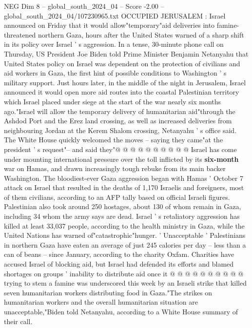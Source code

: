 \begin{textsample}{NEG Dim 8 – global\_south\_2024\_04 – Score -2.00 – global\_south\_2024\_04/107230965.txt}  \label{ex:f8_neg_028}
OCCUPIED JERUSALEM : Israel announced on Friday that it would allow"temporary"aid deliveries into famine-threatened northern Gaza, hours after the United States warned of a sharp shift in its policy over Israel ' s aggression.
In a tense, 30-minute phone call on Thursday, US President Joe Biden told Prime Minister Benjamin Netanyahu that United States policy on Israel was dependent on the protection of civilians and aid workers in Gaza, the first hint of possible conditions to Washington ' s military support.
Just hours later, in the middle of the night in Jerusalem, Israel announced it would open more aid routes into the coastal Palestinian territory which Israel placed under siege at the start of the war nearly six months ago."Israel will allow the temporary delivery of humanitarian aid"through the Ashdod Port and the Erez land crossing, as well as increased deliveries from neighbouring Jordan at the Kerem Shalom crossing, Netanyahu ' s office said.
The White House quickly welcomed the moves -- saying they came"at the president ' s request"-- and said they"@ @ @ @ @ @ @ @ @ @ Israel has come under mounting international pressure over the toll inflicted by its \textbf{six-month} war on Hamas, and drawn increasingly tough rebuke from its main backer Washington.
The bloodiest-ever Gaza aggression began with Hamas ' October 7 attack on Israel that resulted in the deaths of 1,170 Israelis and foreigners, most of them civilians, according to an AFP tally based on official Israeli figures.
Palestinian also took around 250 hostages, about 130 of whom remain in Gaza, including 34 whom the army says are dead.
Israel ' s retaliatory aggression has killed at least 33,037 people, according to the health ministry in Gaza, while the United Nations has warned of"catastrophic"hunger. ' Unacceptable ' Palestinians in northern Gaza have eaten an average of just 245 calories per day -- less than a can of beans -- since January, according to the charity Oxfam.
Charities have accused Israel of blocking aid, but Israel had defended its efforts and blamed shortages on groups ' inability to distribute aid once it @ @ @ @ @ @ @ @ @ @ trying to stem a famine was underscored this week by an Israeli strike that killed seven humanitarian workers distributing food in Gaza."The strikes on humanitarian workers and the overall humanitarian situation are unacceptable,"Biden told Netanyahu, according to a White House summary of their call.

\end{textsample}
